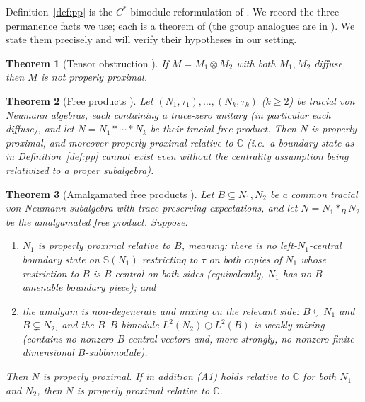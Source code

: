 \documentclass[11pt]{article}
\newtheorem{theorem}{Theorem}
\begin{document}
Definition~\ref{def:pp} is the $C^*$-bimodule reformulation of \cite[\S3]{DEP}. We record the three
permanence facts we use; each is a theorem of \cite{DEP} (the group analogues are in \cite{BIP}). We state
them precisely and will verify their hypotheses in our setting.

\begin{theorem}[Tensor obstruction \cite{DEP}]\label{thm:tensor-obstruct}
If $M=M_1\bar\otimes M_2$ with both $M_1,M_2$ diffuse, then $M$ is \emph{not} properly proximal.
\end{theorem}

\begin{theorem}[Free products \cite{DEP}]\label{thm:freeprod}
Let $(N_1,\tau_1),\dots,(N_k,\tau_k)$ ($k\ge2$) be tracial von Neumann algebras, each containing a
trace-zero unitary (in particular each diffuse), and let $N=N_1*\cdots*N_k$ be their tracial free product.
Then $N$ is properly proximal, and moreover \emph{properly proximal relative to $\mathbb C$} (i.e.\ a boundary
state as in Definition~\ref{def:pp} cannot exist even without the centrality assumption being relativized to
a proper subalgebra).
\end{theorem}

\begin{theorem}[Amalgamated free products \cite{DEP}]\label{thm:perm-afp}
Let $B\subseteq N_1,N_2$ be a common tracial von Neumann subalgebra with trace-preserving expectations, and
let $N=N_1*_B N_2$ be the amalgamated free product. Suppose:
\begin{enumerate}
\item[(A1)] $N_1$ is properly proximal relative to $B$, meaning: there is no left-$N_1$-central boundary
state on $\mathbb S(N_1)$ restricting to $\tau$ on both copies of $N_1$ whose restriction to $B$ is
$B$-central on both sides (equivalently, $N_1$ has no $B$-amenable boundary piece); and
\item[(A2)] the amalgam is \emph{non-degenerate and mixing on the relevant side}: $B\subsetneq N_1$ and
$B\subsetneq N_2$, and the $B$--$B$ bimodule $L^2(N_2)\ominus L^2(B)$ is weakly mixing (contains no nonzero
$B$-central vectors and, more strongly, no nonzero finite-dimensional $B$-subbimodule).
\end{enumerate}
Then $N$ is properly proximal. If in addition (A1) holds relative to $\mathbb C$ for both $N_1$ and $N_2$,
then $N$ is properly proximal relative to $\mathbb C$.
\end{theorem}
\end{document}
